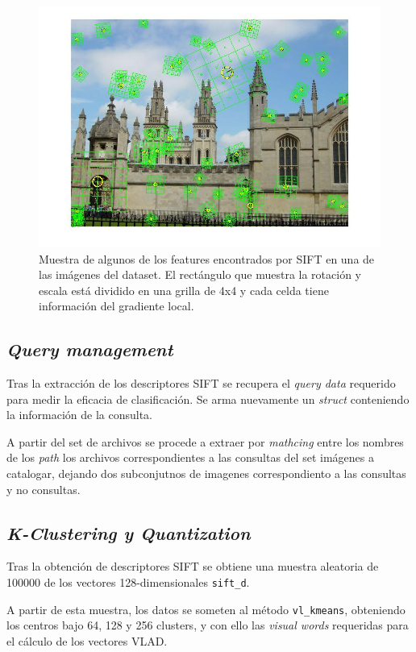 \begin{figure}[htb]
  \centering
  \includegraphics[width=\linewidth]{siftSample}
  \caption{Muestra de algunos de los features encontrados por SIFT en una de las imágenes del dataset. El rectángulo que muestra la rotación y escala está dividido en una grilla de 4x4 y cada celda tiene información del gradiente local.}
  \label{fig:siftSample}
\end{figure}



\subsection{\emph{Query management}}
Tras la extracción de los descriptores SIFT se recupera el \emph{query data} requerido para medir la eficacia de clasificación. Se arma nuevamente un \emph{struct} conteniendo la información de la consulta.

A partir del set de archivos se procede a extraer por \emph{mathcing} entre los nombres de los \emph{path} los archivos correspondientes a las consultas del set imágenes a catalogar, dejando dos subconjutnos de imagenes correspondiento a las consultas y no consultas.



\subsection{\emph{K-Clustering y Quantization}}
Tras la obtención de descriptores SIFT se obtiene una muestra aleatoria de 100000 de los vectores 128-dimensionales \texttt{sift\_d}.

A partir de esta muestra, los datos se someten al método \texttt{vl\_kmeans}, obteniendo los centros bajo 64, 128 y 256 clusters, y con ello las  \emph{visual words} requeridas para el cálculo de los vectores VLAD.

